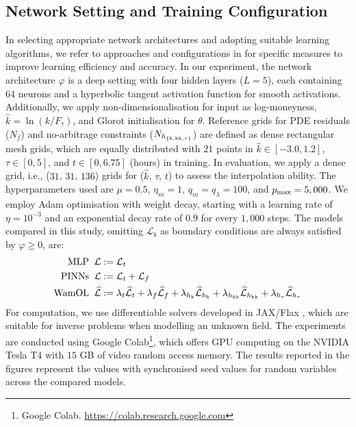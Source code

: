 \documentclass[sigconf, authorversion=true, nonacm=true]{acmart}
\begin{document}
\subsection{Network Setting and Training Configuration}
\label{Neural Network Setting and Training Configuration}
In selecting appropriate network architectures and adopting suitable learning algorithms, we refer to approaches and configurations in \cite{wang2023expert, lu2021physics} for specific measures to improve learning efficiency and accuracy. In our experiment, the network architecture $\varphi$ is a deep setting with four hidden layers ($L=5$), each containing 64 neurons and a hyperbolic tangent activation function for smooth activations. Additionally, we apply non-dimensionalisation for input as log-moneyness, $\widehat{k}=\ln\left(k/F_\tau\right)$, and Glorot initialisation for $\theta$. Reference grids for PDE residuals ($N_f$) and no-arbitrage constraints ($N_{h_{\left\{\rm{k}, \rm{kk}, \rm{\tau}\right\}}}$) are defined as dense rectangular mesh grids, which are equally distributed with $21$ points in $\widehat{k}\in[-3.0, 1.2]$, $\tau\in[0, 5]$, and $t\in[0, 6.75]$ (hours) in training. In evaluation, we apply a dense grid, i.e., ($31$, $31$, $136$) grids for ($\widehat{k}$, $\tau$, $t$) to assess the interpolation ability. The hyperparameters used are $\mu=0.5$, $\eta_m=1$, $q_m = q_\lambda = 100$, and $p_{\rm max}=5,000$. We employ Adam optimisation \citep{kingma2014adam} with weight decay, starting with a learning rate of $\eta=10^{-3}$ and an exponential decay rate of $0.9$ for every $1,000$ steps.
The models compared in this study, omitting $\mathcal{L}_b$ as boundary conditions are always satisfied by $\varphi \geq 0$, are:
\begin{equation}
\begin{aligned}
\text{MLP}& \;\; \mathcal{L} := \mathcal{L}_t \\
\text{PINNs}& \;\; \mathcal{L} := \mathcal{L}_t + \mathcal{L}_f \\
\text{WamOL}& \;\; \widehat{\mathcal{L}} := \lambda_t \widehat{\mathcal{L}}_t + \lambda_f \widehat{\mathcal{L}}_f + \lambda_{h_{\rm k}} \widehat{\mathcal{L}}_{h_{\rm k}} + \lambda_{h_{\rm kk}} \widehat{\mathcal{L}}_{h_{\rm kk}} + \lambda_{h_{\rm \tau}} \widehat{\mathcal{L}}_{h_{\rm \tau}}
\end{aligned}
\end{equation}
For computation, we use differentiable solvers developed in JAX/Flax \cite{jax2018github, flax2020github}, which are suitable for inverse problems when modelling an unknown field. The experiments are conducted using Google Colab\footnote{Google Colab. \url{https://colab.research.google.com}}, which offers GPU computing on the NVIDIA Tesla T4 with $15$ GB of video random access memory. The results reported in the figures represent the values with synchronised seed values for random variables across the compared models.
\end{document}
